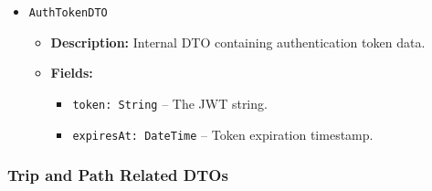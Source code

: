 \begin{itemize}
    \item \texttt{AuthTokenDTO}
    \begin{itemize}
        \item \textbf{Description:} Internal DTO containing authentication token data.
        \item \textbf{Fields:}
        \begin{itemize}
            \item \texttt{token: String} – The JWT string.
            \item \texttt{expiresAt: DateTime} – Token expiration timestamp.
        \end{itemize}
    \end{itemize}
\end{itemize}

\subsubsection{Trip and Path Related DTOs}


